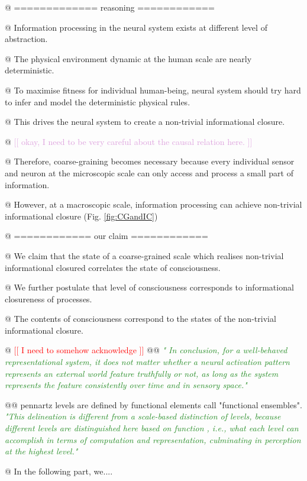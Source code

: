 \documentclass[utf8]{article}
\newenvironment{ants}
			{
			 \begin{easylist}[itemize]		
		 	}
			{
			\end{easylist}
			}
\newcommand{\rewrite}[1]{\textcolor{ForestGreen}{\textit{"#1"}}\newline}
\newcommand{\needref}[1]{%
			\ifthenelse{\equal{#1}{}}{%
				\todo[color=White, linecolor=BlueViolet]{\textcolor{BlueViolet}{Ref}}}{%
				\todo[color=White, linecolor=BlueViolet]{\textcolor{BlueViolet}{Ref: #1}}%
				}%
		}
\newcommand{\idea}[2][Plum]{\noindent
				\textcolor{#1}{[[ #2 ]]}}
\begin{document}
		\begin{ants}
				
			
				@ ============= reasoning ============
				
				@ Information processing in the neural system exists at different level of abstraction.
				
				@ The physical environment dynamic at the human scale are nearly deterministic.\needref{Do we need ref here?} 
				
				@ To maximise fitness for individual human-being, neural system should try hard to infer and model the deterministic physical rules. 
				
				@ This drives the neural system to create a non-trivial informational closure.
				
				@ \idea{okay, I need to be very careful about the causal relation here.}
				
				@ Therefore, coarse-graining becomes necessary because every individual sensor and neuron at the microscopic scale can only access and process a small part of information.
				
				@ However, at a macroscopic scale, information processing can achieve non-trivial informational closure (Fig. \ref{fig:CGandIC})
			
			
				@ ============ our claim  ============
				
				@ We claim that the state of a coarse-grained scale which realises non-trivial informational closured correlates the state of consciousness. 
				
				@ We further postulate that level of consciousness corresponds to informational closureness of processes. 
				
				@ The contents of consciousness correspond to the states of the non-trivial informational closure. 
				
				@ \idea[red]{I need to somehow acknowledge \cite{pennartz2017consciousness}}
					@@ \rewrite{ In conclusion, for a well-behaved representational system, it does not matter whether a neural activation pattern represents an external world feature truthfully or not, as long as the system represents the feature consistently over time and in sensory space.}
					
					@@ pennartz levels are defined by functional elements call "functional ensembles". \cite{pennartz2017consciousness} \rewrite{This delineation is different from a scale-based distinction of levels, because different levels are distinguished here based on function , i.e., what each level can accomplish in terms of computation and representation, culminating in perception at the highest level.}
					
					
				
				
				@ In the following part, we....
											
				
		\end{ants}
		
\end{document}
